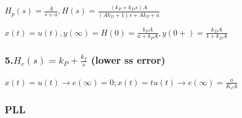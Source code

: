 $H_p(s)=\frac{A}{s+a}, H(s)=\frac{(k_P+k_Ds)A}{(Ak_D+1)s+Ak_P+a}$

$x(t)=u(t), y(\infty)=H(0)=\frac{k_PA}{a+k_PA}, y(0+)=\frac{k_DA}{1+k_DA}$

\subsubsection*{5.$H_c(s) = k_P+\frac{k_I}{s}$ (lower ss error)}

$x(t)=u(t)\rightarrow e(\infty)=0; x(t) = tu(t)\rightarrow e(\infty) = \frac{a}{K_IA}$

\subsubsection*{PLL}

